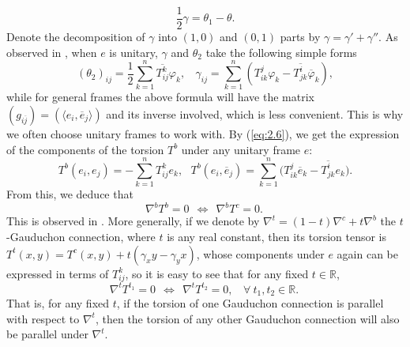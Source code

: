 \documentclass{amsart}
\numberwithin{equation}{section}
\theoremstyle{definition}
\renewcommand{\1}{\mathds{1}}
\renewcommand{\>}{\rightarrow}
\begin{document}
\[ \frac{1}{2}\gamma = \theta_1 - \theta .\]
Denote the decomposition of $\gamma$ into $(1,0)$ and $(0,1)$ parts by $\gamma = \gamma ' + \gamma ''$.
As observed in \cite{YZ18Cur}, when $e$ is unitary, $\gamma $ and $\theta_2$ take the following simple forms
\begin{equation}
(\theta_2)_{ij} = \frac{1}{2}\sum_{k=1}^n \overline{T^k_{ij}} \varphi_k, \ \ \ \ \gamma_{ij} = \sum_{k=1}^n ( T_{ik}^j \varphi_k - \overline{T^i_{jk}} \overline{\varphi}_k ), \label{eq:2.6}
\end{equation}
while for general frames the above formula will have the matrix $(g_{i\overline{j}})=(\langle e_i,\overline{e}_j \rangle )$ and its inverse involved, which is less convenient. This is why we often choose unitary frames to work with. By (\ref{eq:2.6}), we get the expression of the components of the torsion $T^b$ under any unitary frame $e$:
\begin{equation}
T^b(e_i,e_j) = - \sum_{k=1}^n T^k_{ij}e_k, \ \ \ T^b(e_i, \overline{e}_j) = \sum_{k=1}^n \big( T^j_{ik}\overline{e}_k - \overline{T^i_{jk}} e_k \big) . \label{eq:2.7}
\end{equation}
From this, we deduce that
\begin{equation}
\nabla^bT^b=0 \ \ \Longleftrightarrow \ \ \nabla^bT^c =0. \ \label{eq:2.8}
\end{equation}
This is observed  in \cite[the proof of Proposition 1]{ZhaoZ19Str}. More generally, if we denote by $\nabla^t = (1-t)\nabla^c + t \nabla^b$ the $t$-Gauduchon connection, where $t$ is any real constant, then its torsion tensor is $T^t(x,y)=T^c(x,y)+ t(\gamma_xy -\gamma_yx)$, whose components under $e$ again can be expressed in terms of  $T^k_{ij}$, so it is easy to see that for any fixed $t\in {\mathbb R}$,
\begin{equation}
\nabla^tT^{t_1}=0 \ \ \Longleftrightarrow  \ \ \nabla^tT^{t_2} =0, \ \ \ \ \forall \  t_1, t_2 \in \mathbb{R}. \ \label{eq:2.9}
\end{equation}
That is, for any fixed $t$, if the torsion of one Gauduchon connection is parallel with respect to $\nabla^t$, then the torsion of any other Gauduchon connection will also be parallel under $\nabla^t$.
\end{document}

